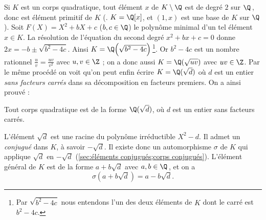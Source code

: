 \documentclass[11pt, useosf,
  title in boldface,
  theorem in new line,
  theorem numbering = section,
  number theorems separately,
]{simplivre}
\begin{document}
    Si \( K \) est un corps quadratique, tout élément \( x \) de \( K \setminus \Q \) est de degré \( 2 \) sur \( \Q \)\,, donc est élément primitif de \( K \) (\ie. \( K = \Q[x] \), et \( (1,x) \) est une base de \( K \) sur \( \Q \)). Soit \( F(X) = X^2+bX+c \) (\( b,c \in \Q \)) le polynôme minimal d'un tel élément \( x \in K \). La résolution de l'équation du second degré \( x^2+bx+c = 0 \) donne \( 2x = -b \pm \sqrt{b^2-4c} \). Ainsi \( K = \Q\Bigl(\sqrt{b^2-4c}\Bigr) \)\,\footnote{Par \( \sqrt{b^2-4c} \) nous entendons l'un des deux éléments de \( K \) dont le carré est \( b^2-4c \).}. Or \( b^2-4c \) est un nombre rationnel \( \frac{u}{v} = \frac{uv}{v^2} \) avec \( u,v \in \Z \) ; on a donc aussi \( K = \Q(\sqrt{uv}) \) avec \( uv \in \Z \). Par le même procédé on voit qu'on peut enfin écrire \( K = \Q(\sqrt{d}) \) où \( d \) est un entier \emph{sans facteurs carrés} dans sa décomposition en facteurs premiers. On a ainsi prouvé :
    \begin{proposition}
        Tout corps quadratique est de la forme \( \Q(\sqrt{d}) \), où \( d \) est un entier sans facteurs carrés.
    \end{proposition}

    L'élément \( \sqrt{d} \) est une racine du polynôme irréductible \( X^2-d \). Il admet un \emph{conjugué} dans \( K \), à savoir \( -\sqrt{d} \). Il existe donc un automorphisme \( \sigma \) de \( K \) qui applique \( \sqrt{d} \) en \( -\sqrt{d} \) (\cref{sec:éléments conjugués;corps conjugués}). L'élément général de \( K \) est de la forme \( a+b\sqrt{d} \) avec \( a,b \in \Q \)\,, et on a
    \begin{equation}\label{eq:quadratique;automorphisme}
        \sigma(a+b\sqrt{d}) = a-b\sqrt{d}.
    \end{equation}
\end{document}
